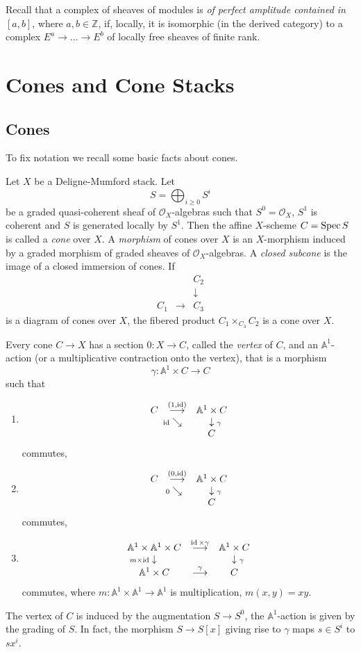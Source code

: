 \documentclass[11pt]{article}
\theoremstyle{plain}
\theoremstyle{definition}
\newcommand{\zz}{{\mathbb{Z}}}
\newcommand{\aaa}{{\mathbb{A}}}
\renewcommand{\O}{{\mathcal{O}}}
\newcommand{\spec}{\mathop{\rm Spec}\nolimits}
\newcommand{\id}{\mathop{\rm id}}
\newcommand{\ldiag}[1]
       {\makebox[0cm]{\({\scriptstyle#1}\downarrow\phantom{\scriptstyle#1}\)}}
\newcommand{\rdiag}[1]
       {\makebox[0cm]{\(\phantom{\scriptstyle#1}\downarrow{\scriptstyle#1}\)}}
\newcommand{\sediag}[1]
       {\makebox[0cm]{\({\scriptstyle#1}\searrow\phantom{\scriptstyle#1}\)}}
\newcommand{\comdia}[9]{
\begin{array}{ccc}
#1 & \stackrel{#2}{\longrightarrow} & #3 \\
\ldiag{#4} & #5 & \rdiag{#6} \\
#7 & \stackrel{#8}{\longrightarrow} & #9
\end{array}}
\newcommand{\comtri}[6]{
\begin{array}{ccc}
#1 & \stackrel{#2}{\longrightarrow} & #3         \\
   & \sediag{#4}                    & \rdiag{#5} \\
   &                                & #6
\end{array}}
\theoremstyle{plain}
\theoremstyle{definition}
\theoremstyle{remark}
\begin{document}
Recall that a complex of sheaves of modules is {\em of perfect
amplitude contained in \([a,b]\)}, where \(a,b\in\zz\), if, locally, it is
isomorphic (in the derived category) to a complex \(E^a\to\ldots\to E^b\)
of locally free sheaves of finite rank.

\section{Cones and Cone Stacks}

\subsection{Cones}

To fix notation we recall some basic facts about cones.

Let \(X\) be a Deligne-Mumford stack. Let
\[
S=\bigoplus_{i\geq0}S^i
\]
be a graded quasi-coherent sheaf of \(\O_X\)-algebras such that
\(S^0=\O_X\), \(S^1\) is coherent and \(S\) is generated locally by
\(S^1\). Then the affine \(X\)-scheme \(C=\spec S\) is called a {\em cone
}over \(X\). A {\em morphism }of cones over \(X\) is an \(X\)-morphism
induced by a graded morphism of graded sheaves of \(\O_X\)-algebras.  A
{\em closed subcone }is the image of a closed immersion of cones.  If
\[
\begin{array}{ccc}
 & & C_2 \\
 & & \downarrow \\ C_1 & \longrightarrow & C_3
\end{array}
\]
is a diagram of cones over \(X\), the fibered product
\(C_1\times_{C_3}C_2\) is a cone over \(X\).

Every cone \(C\to X\) has a section \(0:X\to C\), called the {\em vertex
}of \(C\), and an \(\aaa^1\)-action (or a multiplicative contraction onto
the vertex), that is a morphism
\[
\gamma:\aaa^1\times C\longrightarrow C
\]
such that
\begin{enumerate}
\item
\[
\comtri{C}{(1,\id)}{\aaa^1\times C}{\id}{\gamma}{C}
\]
commutes,
\item
\[
\comtri{C}{(0,\id)}{\aaa^1\times C}{0}{\gamma}{C}
\]
commutes,
\item
\[
\comdia{\aaa^1\times\aaa^1\times C} {\id\times\gamma}
{\aaa^1\times C} {m\times\id}{}{\gamma} {\aaa^1\times C}{\gamma}{C}
\]
commutes, where \(m:\aaa^1\times\aaa^1\to\aaa^1\) is multiplication,
\(m(x,y)=xy\).
\end{enumerate}
The vertex of \(C\) is induced by the augmentation \(S\to S^0\), the
\(\aaa^1\)-action is given by the grading of \(S\). In fact, the morphism
\(S\to S[x]\) giving rise to \(\gamma\) maps \(s\in S^i\) to \(sx^i\).
\end{document}
